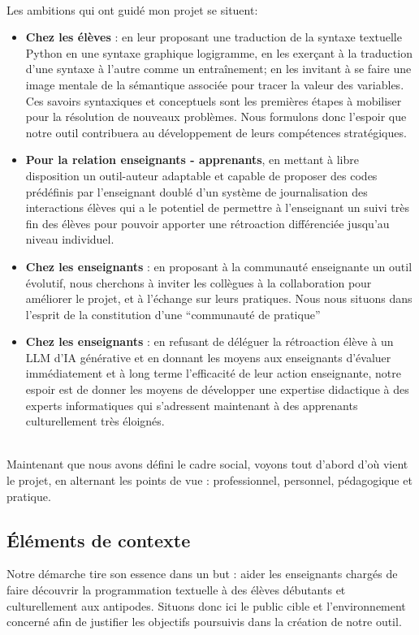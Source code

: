 \documentclass[11pt,a4paper]{article}
\let\cite\parencite
\begin{document}
 \\
\par Les ambitions qui ont guidé mon projet se situent:
\begin{itemize}
    \item \textbf{Chez les élèves} : en leur proposant une traduction de la syntaxe textuelle Python en une syntaxe graphique logigramme, en les exerçant à la traduction d'une syntaxe à l'autre comme un entraînement; en les invitant à se faire une image mentale de la sémantique associée pour tracer la valeur des variables. Ces savoirs syntaxiques et conceptuels sont les premières étapes à mobiliser pour la résolution de nouveaux problèmes. Nous formulons donc l'espoir que notre outil contribuera au développement de leurs compétences stratégiques.
    \item \textbf{Pour la relation enseignants - apprenants}, en mettant à libre disposition un outil-auteur adaptable et capable de proposer des codes prédéfinis par l'enseignant doublé d'un système de journalisation des interactions élèves qui a le potentiel de permettre à l'enseignant un suivi très fin des élèves pour pouvoir apporter une rétroaction différenciée jusqu'au niveau individuel.
    \item \textbf{Chez les enseignants} : en proposant à la communauté enseignante un outil évolutif, nous cherchons à inviter les collègues à la collaboration pour améliorer le projet, et à l'échange sur leurs pratiques. Nous nous situons dans l'esprit de la constitution d'une ``communauté de pratique'' \cite{wenger} \item \textbf{Chez les enseignants} : en refusant de déléguer la rétroaction élève à un LLM d'IA générative et en donnant les moyens aux enseignants d'évaluer immédiatement et à long terme l'efficacité de leur action enseignante, notre espoir est de donner les moyens de développer une expertise didactique à des experts informatiques qui s'adressent maintenant à des apprenants culturellement très éloignés.
\end{itemize}
\\Maintenant que nous avons défini le cadre social, voyons tout d'abord d'où vient le projet, en alternant les points de vue : professionnel, personnel, pédagogique et pratique.

\subsection{Éléments de contexte}
Notre démarche tire son essence dans un but : aider les enseignants chargés de faire découvrir la programmation textuelle à des élèves débutants et culturellement aux antipodes. Situons donc ici le public cible et l'environnement concerné afin de justifier les objectifs poursuivis dans la création de notre outil. 
\end{document}
